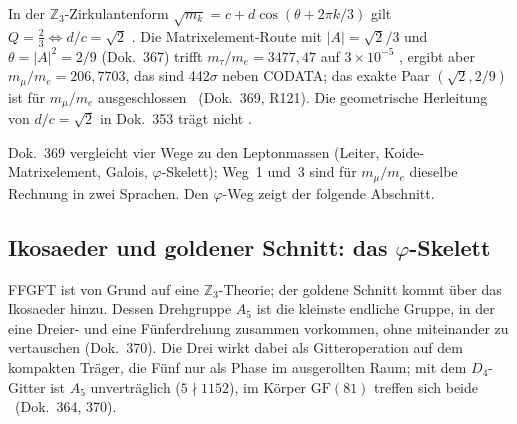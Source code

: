 In der $\mathbb Z_3$-Zirkulantenform
$\sqrt{m_k}=c+d\cos(\theta+2\pi k/3)$ gilt $Q=\tfrac23\Leftrightarrow d/c=\sqrt2$ \BM. Die
Matrixelement-Route mit $|A|=\sqrt2/3$ und $\theta=|A|^2=2/9$ (Dok.~367) trifft
$m_\tau/m_e=3477{,}47$ auf $3\times10^{-5}$ \KM, ergibt aber $m_\mu/m_e=206{,}7703$, das
sind 442$\sigma$ neben CODATA; das exakte Paar $(\sqrt2,2/9)$ ist für $m_\mu/m_e$ ausgeschlossen
\XM\ (Dok.~369, R121). Die geometrische Herleitung von $d/c=\sqrt2$ in Dok.~353 trägt nicht \SM.

Dok.~369 vergleicht vier Wege zu den Leptonmassen (Leiter, Koide-Matrixelement, Galois,
$\varphi$-Skelett); Weg~1 und~3 sind für $m_\mu/m_e$ dieselbe Rechnung in zwei Sprachen. Den
$\varphi$-Weg zeigt der folgende Abschnitt.

\subsection{Ikosaeder und goldener Schnitt: das \texorpdfstring{$\varphi$}{phi}-Skelett}

FFGFT ist von Grund auf eine $\mathbb Z_3$-Theorie; der goldene Schnitt kommt über das Ikosaeder
hinzu. Dessen Drehgruppe $A_5$ ist die kleinste endliche Gruppe, in der eine Dreier- und eine
Fünferdrehung zusammen vorkommen, ohne miteinander zu vertauschen (Dok.~370). Die Drei wirkt
dabei als Gitteroperation auf dem kompakten Träger, die Fünf nur als Phase im ausgerollten Raum;
mit dem $D_4$-Gitter ist $A_5$ unverträglich ($5\nmid1152$), im Körper $\mathrm{GF}(81)$ treffen
sich beide \BM\ (Dok.~364, 370).

